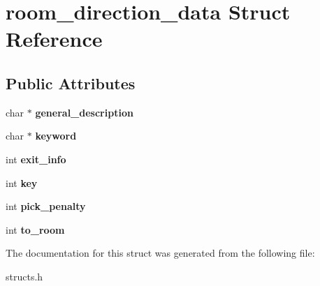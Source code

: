 \hypertarget{structroom__direction__data}{\section{room\-\_\-direction\-\_\-data Struct Reference}
\label{structroom__direction__data}
}
\subsection*{Public Attributes}
\begin{DoxyCompactItemize}
\item 
\hypertarget{structroom__direction__data_a1ade427d564a7a8f6777187eabd8bb33}{char $\ast$ {\bfseries general\-\_\-description}}\label{structroom__direction__data_a1ade427d564a7a8f6777187eabd8bb33}

\item 
\hypertarget{structroom__direction__data_a474e18e08063ab1ceee6515055dd1bc6}{char $\ast$ {\bfseries keyword}}\label{structroom__direction__data_a474e18e08063ab1ceee6515055dd1bc6}

\item 
\hypertarget{structroom__direction__data_ad4e0b315a7b257e243a46493c820e690}{int {\bfseries exit\-\_\-info}}\label{structroom__direction__data_ad4e0b315a7b257e243a46493c820e690}

\item 
\hypertarget{structroom__direction__data_a7dbbe646bb08df5182a5c0e9f0d9f96a}{int {\bfseries key}}\label{structroom__direction__data_a7dbbe646bb08df5182a5c0e9f0d9f96a}

\item 
\hypertarget{structroom__direction__data_a27858fd25c97d5ebb67c6381b0dcd4b6}{int {\bfseries pick\-\_\-penalty}}\label{structroom__direction__data_a27858fd25c97d5ebb67c6381b0dcd4b6}

\item 
\hypertarget{structroom__direction__data_a579f4d62f8f19916d36630ceccdceb1e}{int {\bfseries to\-\_\-room}}\label{structroom__direction__data_a579f4d62f8f19916d36630ceccdceb1e}

\end{DoxyCompactItemize}


The documentation for this struct was generated from the following file\-:\begin{DoxyCompactItemize}
\item 
structs.\-h\end{DoxyCompactItemize}
